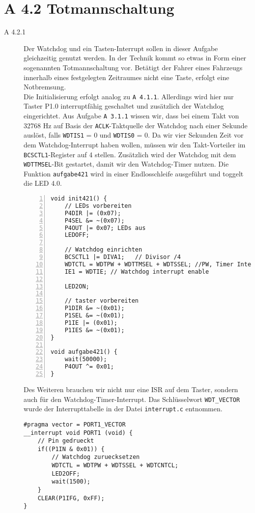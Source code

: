 \documentclass[11pt,a4paper,ngerman]{article}
\begin{document}
\section*{A 4.2 Totmannschaltung}
\begin{description}
	\item[A 4.2.1] Der Watchdog und ein Tasten-Interrupt sollen in dieser Aufgabe gleichzeitig genutzt werden. In der Technik kommt so etwas in Form einer sogenannten Totmannschaltung vor. Betätigt der Fahrer eines Fahrzeugs innerhalb eines festgelegten Zeitraumes nicht eine Taste, erfolgt eine Notbremsung. \\

Die Initialisierung erfolgt analog zu \texttt{A 4.1.1}. Allerdings wird hier nur Taster P1.0 interruptfähig geschaltet und zusätzlich der Watchdog eingerichtet. Aus Aufgabe \texttt{A 3.1.1} wissen wir, dass bei einem Takt von 32768 Hz auf Basis der \texttt{ACLK}-Taktquelle der Watchdog nach einer Sekunde auslöst, falls \texttt{WDTIS1} = 0 und \texttt{WDTIS0} = 0. Da wir vier Sekunden Zeit vor dem Watchdog-Interrupt haben wollen, müssen wir den Takt-Vorteiler im \texttt{BCSCTL1}-Register auf 4 stellen. Zusätzlich wird der Watchdog mit dem \texttt{WDTTMSEL}-Bit gestartet, damit wir den Watchdog-Timer nutzen. Die Funktion \texttt{aufgabe421} wird in einer Endlosschleife ausgeführt und toggelt die LED 4.0.

\begin{lstlisting}[numbers=left]
void init421() {
	// LEDs vorbereiten
	P4DIR |= (0x07);
	P4SEL &= ~(0x07);
	P4OUT |= 0x07; LEDs aus
	LEDOFF;
	
	// Watchdog einrichten
	BCSCTL1 |= DIVA1;	// Divisor /4
	WDTCTL = WDTPW + WDTTMSEL + WDTSSEL; //PW, Timer Interval, ACLK
	IE1 = WDTIE; // Watchdog interrupt enable
	
	LED2ON;
	
	// taster vorbereiten
	P1DIR &= ~(0x01);
	P1SEL &= ~(0x01);
	P1IE |= (0x01);
	P1IES &= ~(0x01);
}

void aufgabe421() {
	wait(50000);
	P4OUT ^= 0x01;
}
\end{lstlisting}
	
Des Weiteren brauchen wir nicht nur eine ISR auf dem Taster, sondern auch für den Watchdog-Timer-Interrupt. Das Schlüsselwort \texttt{WDT\_VECTOR} wurde der Interrupttabelle in der Datei \texttt{interrupt.c} entnommen.
\newpage
\begin{lstlisting}
#pragma vector = PORT1_VECTOR
__interrupt void PORT1 (void) {
	// Pin gedrueckt
	if((P1IN & 0x01)) {
		// Watchdog zuruecksetzen
		WDTCTL = WDTPW + WDTSSEL + WDTCNTCL;
		LED2OFF;
		wait(1500);
	}
	CLEAR(P1IFG, 0xFF);
}



\end{lstlisting}
\end{description}
\end{document}
